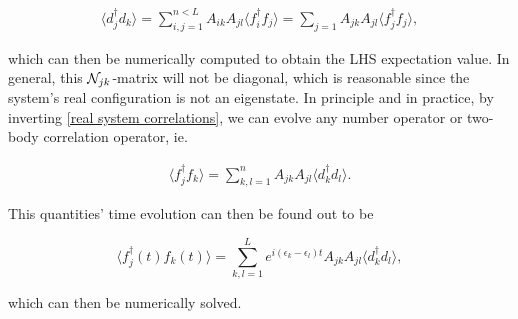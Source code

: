 \documentclass{homework}
\begin{document}
\begin{align*}
    \langle d_j^\dagger d_k \rangle = \sum_{i,j = 1}^{n < L} A_{ik} A_{jl} \langle f_i^\dagger f_j \rangle = \sum_{j=1} A_{jk} A_{jl} \langle f_j^\dagger f_j \rangle,
    \label{real system correlations}
\end{align*}

which can then be numerically computed to obtain the LHS expectation value. In general, this $\mathcal{N}_{jk}$-matrix will not be diagonal, which is reasonable since the system's real configuration is not an eigenstate. In principle and in practice, by inverting \eqref{real system correlations}, we can evolve any number operator or two-body correlation operator, ie.

\begin{align}
    \langle f_j^\dagger f_k \rangle = \sum_{k,l =1}^{n} A_{jk} A_{jl} \langle d_k^\dagger d_l \rangle.
\end{align}

This quantities' time evolution can then be found out to be 

\begin{equation}
    \langle f_j^\dagger(t) f_k(t) \rangle = \sum_{k,l =1}^{L} e^{i(\epsilon_k - \epsilon_l)t}A_{jk} A_{jl} \langle d_k^\dagger d_l \rangle,
\end{equation}

which can then be numerically solved. 
\end{document}
